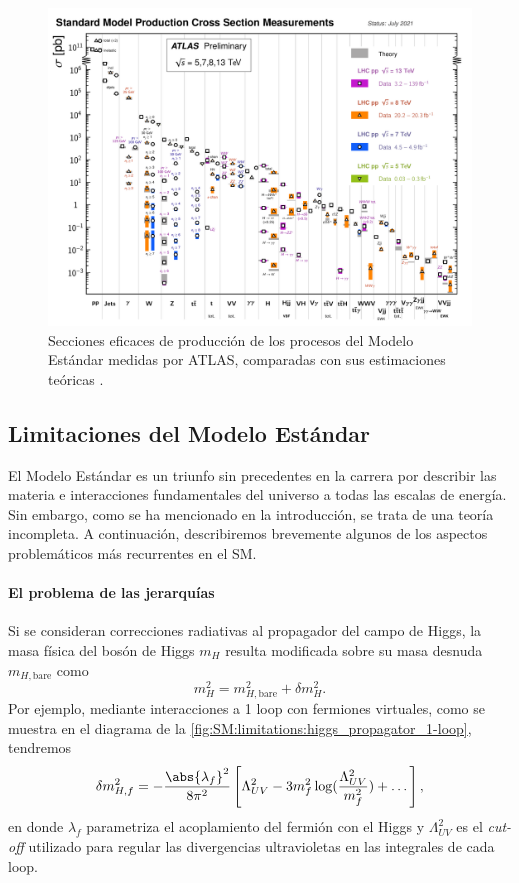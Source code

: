 \begin{figure}[t]
  \includegraphics[width=\linewidth]{Assets/Plots/SM/ATLAS_b_SMSummary_FiducialXsect.pdf}
  \caption{Secciones eficaces de producción de los procesos del Modelo Estándar medidas por ATLAS, comparadas con sus estimaciones teóricas .}
  \label{fig:ch1:SM:pp_interactions:cross_sections}
\end{figure}





\subsection{Limitaciones del Modelo Estándar}

El Modelo Estándar es un triunfo sin precedentes en la carrera por describir las materia e interacciones fundamentales del universo a todas las escalas de energía. Sin embargo, como se ha mencionado en la introducción, se trata de una teoría incompleta. A continuación, describiremos brevemente algunos de los aspectos problemáticos más recurrentes en el SM.

\paragraph{El problema de las jerarquías}

Si se consideran correcciones radiativas al propagador del campo de Higgs, la masa física del bosón de Higgs $m_H$ resulta modificada sobre su masa desnuda $m_{H, \text{bare}}$ como
\[ m_H^2 = m_{H, \text{bare}}^2 + \delta m_H^2. \]
Por ejemplo, mediante interacciones a 1 loop con fermiones virtuales, como se muestra en el diagrama de la \cref{fig:SM:limitations:higgs_propagator_1-loop}, tendremos
\[ \delta m_{H, f}^2 = -\frac{\abs{\lambda_f}^2}{8\pi^2} \left[ \Lambda_{UV}^2 - 3 m_f^2 \log(\frac{\Lambda_{UV}^2}{m_f^2}) + \dots \right], \]
en donde $\lambda_f$ parametriza el acoplamiento del fermión con el Higgs y $\Lambda_{UV}^2$ es el \textit{cut-off} utilizado para regular las divergencias ultravioletas en las integrales de cada loop.

